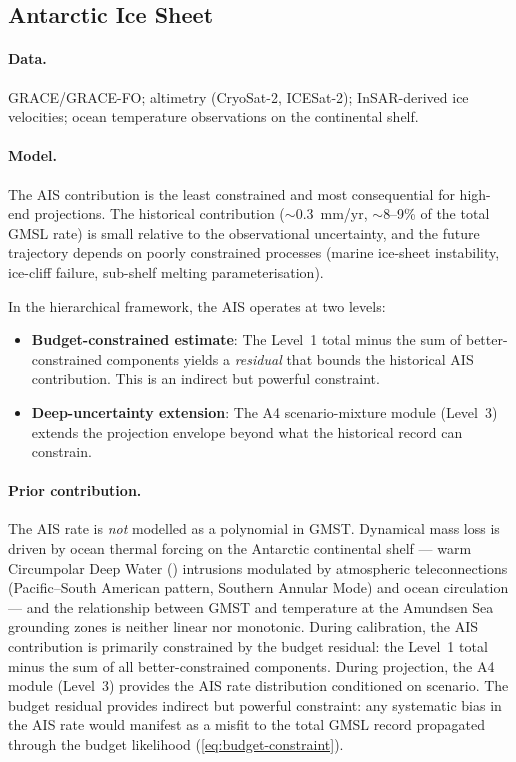 \documentclass[11pt]{article}
\newcommand{\CDW}{\text{CDW}}
\begin{document}
\subsection{Antarctic Ice Sheet}
\label{sec:ais}

\paragraph{Data.}  GRACE/GRACE-FO; altimetry (CryoSat-2, ICESat-2); InSAR-derived ice velocities; ocean temperature observations on the continental shelf.

\paragraph{Model.}  The AIS contribution is the least constrained and most consequential for high-end projections.  The historical contribution ($\sim$0.3~mm/yr, $\sim$8--9\% of the total GMSL rate) is small relative to the observational uncertainty, and the future trajectory depends on poorly constrained processes (marine ice-sheet instability, ice-cliff failure, sub-shelf melting parameterisation).

In the hierarchical framework, the AIS operates at two levels:
\begin{itemize}
  \item \textbf{Budget-constrained estimate}: The Level~1 total minus the sum of better-constrained components yields a \emph{residual} that bounds the historical AIS contribution.  This is an indirect but powerful constraint.
  \item \textbf{Deep-uncertainty extension}: The A4 scenario-mixture module (Level~3) extends the projection envelope beyond what the historical record can constrain.
\end{itemize}

\paragraph{Prior contribution.}  The AIS rate is \emph{not} modelled as a polynomial in GMST.  Dynamical mass loss is driven by ocean thermal forcing on the Antarctic continental shelf --- warm Circumpolar Deep Water (\CDW) intrusions modulated by atmospheric teleconnections (Pacific--South American pattern, Southern Annular Mode) and ocean circulation --- and the relationship between GMST and \CDW{} temperature at the Amundsen Sea grounding zones is neither linear nor monotonic.  During calibration, the AIS contribution is primarily constrained by the budget residual: the Level~1 total minus the sum of all better-constrained components.  During projection, the A4 module (Level~3) provides the AIS rate distribution conditioned on scenario.  The budget residual provides indirect but powerful constraint: any systematic bias in the AIS rate would manifest as a misfit to the total GMSL record propagated through the budget likelihood (\cref{eq:budget-constraint}).
\end{document}
